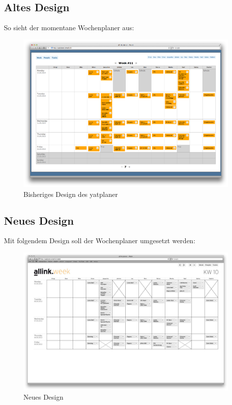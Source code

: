 \subsection{Altes Design}
So sieht der momentane Wochenplaner aus:
\begin{figure}[!ht]
\begin{center}
\includegraphics[width=0.99\textwidth,angle=0]{./bilder/yatplaner.png}
\caption{Bisheriges Design des yatplaner}
\end{center}
\end{figure}

\clearpage
\subsection{Neues Design}
Mit folgendem Design soll der Wochenplaner umgesetzt werden:
\begin{figure}[!ht]
\begin{center}
\includegraphics[width=0.99\textwidth,angle=0]{./bilder/wochenplaner.jpg}
\caption{Neues Design}
\end{center}
\end{figure}

